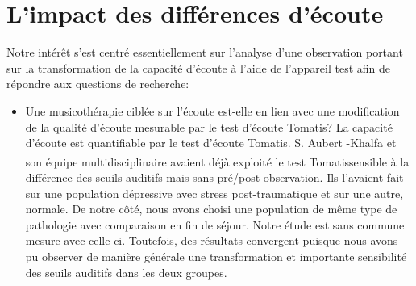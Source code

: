   \section{ L'impact des différences d'écoute }
 Notre intérêt s'est centré essentiellement sur l'analyse d'une
 	observation
 portant sur la transformation de la capacité d'écoute à l'aide de
 l'appareil test afin de répondre aux questions de recherche: 
  \begin{itemize}
       \item Une musicothérapie ciblée sur l'écoute  est-elle en lien avec une modification de la qualité 
       d'écoute 
       mesurable par le test d'écoute Tomatis?
          La capacité d'écoute est quantifiable  par le test d'écoute Tomatis.
  S. Aubert -Khalfa et son équipe multidisciplinaire \autocite{affectiveDisorders} avaient déjà
  exploité le test Tomatis\textsuperscript \textregistered    sensible à la différence des
  seuils auditifs mais sans pré/post observation. Ils l'avaient fait sur une population
  dépressive avec stress post-traumatique et sur une autre, normale. De notre côté, nous avons choisi
  une population de même type de pathologie avec comparaison en fin de séjour.
  Notre étude est sans commune mesure avec celle-ci. Toutefois, 
  des résultats convergent puisque nous avons pu observer de manière générale  une transformation et 
  importante sensibilité des seuils auditifs dans les deux groupes. 
  

\end{itemize}
